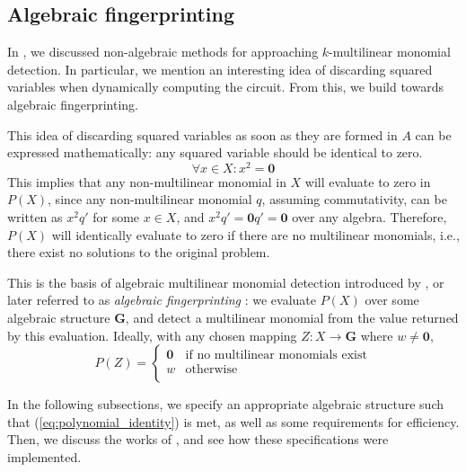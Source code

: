\subsection{Algebraic fingerprinting}
\label{sect:algebraic_fingerprinting}

In , we discussed non-algebraic methods 
for approaching $k$-multilinear monomial detection. In particular, we mention
an interesting idea of discarding squared variables when dynamically 
computing the circuit. From this, we build towards algebraic fingerprinting. 

This idea of discarding squared variables as soon as they are formed in $A$ 
can be expressed mathematically: any squared variable should be identical to
zero. 
\begin{equation}
  \label{eq:squared_to_zero}
\forall x \in X: x^2 = \mathbf{0}
\end{equation}
This implies that any non-multilinear monomial in $X$ will evaluate to zero in $P(X)$, since 
any non-multilinear monomial $q$, assuming commutativity, can be written as $x^2q'$ 
for some $x \in X$, and $x^2q' = \mathbf{0}q' = \mathbf{0}$ over any algebra. 
Therefore, $P(X)$ will identically evaluate to zero if there are no multilinear monomials, 
i.e., there exist no solutions to the original problem.

This is the basis of algebraic multilinear monomial detection introduced by 
\textcite{Koutis08}, 
or later referred to as \emph{algebraic fingerprinting} \cite{KouWil15}: 
we evaluate $P(X)$ over some algebraic structure $\mathbf{G}$, 
and detect a multilinear monomial from 
the value returned by this evaluation. Ideally, with any 
chosen mapping $Z \colon X \to \mathbf{G}$ 
where $w \neq \mathbf{0}$, 
\begin{equation}
  \label{eq:polynomial_identity}
  P(Z) =
    \begin{cases}
      \mathbf{0} & \text{if no multilinear monomials exist}\\
      w & \text{otherwise}\\
    \end{cases}       
\end{equation}

In the following subsections, we specify an appropriate algebraic structure such that 
(\ref{eq:polynomial_identity}) is met, as well as some requirements for efficiency. 
Then, we discuss the works of \textcite{Koutis08}, 
and see how these specifications were implemented.

